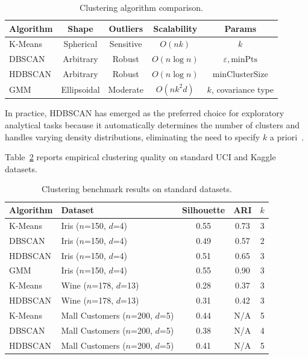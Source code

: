 \documentclass[12pt, a4paper]{article}
\begin{document}
\begin{table}[ht]
\centering
\caption{Clustering algorithm comparison.}
\label{tab:clustering}
\begin{tabular}{lcccc}
\toprule
\textbf{Algorithm} & \textbf{Shape} & \textbf{Outliers} & \textbf{Scalability} & \textbf{Params} \\
\midrule
K-Means   & Spherical  & Sensitive   & $O(nk)$      & $k$ \\
DBSCAN    & Arbitrary  & Robust      & $O(n \log n)$ & $\varepsilon, \text{minPts}$ \\
HDBSCAN   & Arbitrary  & Robust      & $O(n \log n)$ & minClusterSize \\
GMM       & Ellipsoidal & Moderate   & $O(nk^2d)$   & $k$, covariance type \\
\bottomrule
\end{tabular}
\end{table}

In practice, HDBSCAN has emerged as the preferred choice for exploratory analytical tasks because it automatically determines the number of clusters and handles varying density distributions, eliminating the need to specify $k$ a priori~\citep{mcinnes2017hdbscan}.

Table~\ref{tab:clustering-benchmarks} reports empirical clustering quality on standard UCI and Kaggle datasets.

\begin{table}[ht]
\centering
\caption{Clustering benchmark results on standard datasets.}
\label{tab:clustering-benchmarks}
\begin{tabular}{llccr}
\toprule
\textbf{Algorithm} & \textbf{Dataset} & \textbf{Silhouette} & \textbf{ARI} & \textbf{$k$} \\
\midrule
K-Means & Iris ($n$=150, $d$=4)           & 0.55 & 0.73 & 3 \\
DBSCAN  & Iris ($n$=150, $d$=4)           & 0.49 & 0.57 & 2 \\
HDBSCAN & Iris ($n$=150, $d$=4)           & 0.51 & 0.65 & 3 \\
GMM     & Iris ($n$=150, $d$=4)           & 0.55 & 0.90 & 3 \\
\midrule
K-Means & Wine ($n$=178, $d$=13)          & 0.28 & 0.37 & 3 \\
HDBSCAN & Wine ($n$=178, $d$=13)          & 0.31 & 0.42 & 3 \\
\midrule
K-Means & Mall Customers ($n$=200, $d$=5) & 0.44 & N/A & 5 \\
DBSCAN  & Mall Customers ($n$=200, $d$=5) & 0.38 & N/A & 4 \\
HDBSCAN & Mall Customers ($n$=200, $d$=5) & 0.41 & N/A & 5 \\
\bottomrule
\end{tabular}
\end{table}
\end{document}
